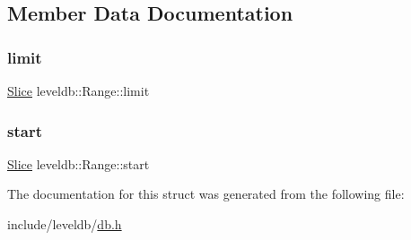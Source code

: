 \subsection{Member Data Documentation}
\mbox{\label{structleveldb_1_1_range_a9c45c46ac20a1c86c265f1f9c35d6632}} 
\subsubsection{\texorpdfstring{limit}{limit}}
{\footnotesize\ttfamily \mbox{\hyperlink{classleveldb_1_1_slice}{Slice}} leveldb\+::\+Range\+::limit}

\mbox{\label{structleveldb_1_1_range_ad80a55e20eb7d864d497e8f94953c00d}} 
\subsubsection{\texorpdfstring{start}{start}}
{\footnotesize\ttfamily \mbox{\hyperlink{classleveldb_1_1_slice}{Slice}} leveldb\+::\+Range\+::start}



The documentation for this struct was generated from the following file\+:\begin{DoxyCompactItemize}
\item 
include/leveldb/\mbox{\hyperlink{db_8h}{db.\+h}}\end{DoxyCompactItemize}
